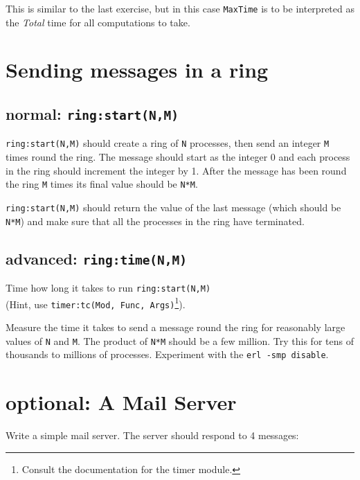 \documentclass[12pt]{hitec}
\begin{document}
This is similar to the last exercise, but in this case \verb+MaxTime+ is to
be interpreted as the {\sl Total} time for all computations to take.

\section{Sending messages in a ring}

\subsection{normal: \texttt{ring:start(N,M)}}

\verb+ring:start(N,M)+ should create a ring of \verb+N+ processes,
then send an integer \verb+M+ times round the ring. The message should
start as the integer 0 and each process in the ring should increment
the integer by 1.  After the message has been round the ring \verb+M+
times its final value should be \verb+N*M+. 

\verb+ring:start(N,M)+ should return the value of the last message
(which should be \verb+N*M+) and make sure that all the processes in
the ring have terminated.

\subsection{advanced: \texttt{ring:time(N,M)}}

Time how long it takes to run \verb+ring:start(N,M)+\\
(Hint, use
\verb+timer:tc(Mod, Func, Args)+\footnote{Consult the documentation for
  the timer module.}).

Measure the time it takes to send a message round the ring for
reasonably large values of \verb+N+ and \verb+M+. The product
of \verb+N*M+ should be a few million. Try this for tens of thousands to
millions of processes. Experiment with the \verb+erl -smp disable+.

\section{optional: A Mail Server}

Write a simple mail server. The server should respond to 4 messages:
\end{document}
